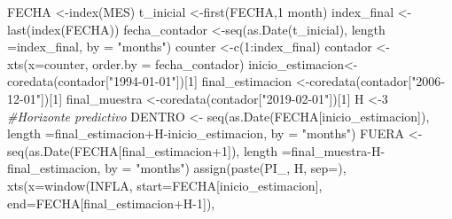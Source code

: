 \documentclass[
]{book}
\newenvironment{Shaded}{\begin{snugshade}}{\end{snugshade}}
\newcommand{\AttributeTok}[1]{\textcolor[rgb]{0.77,0.63,0.00}{#1}}
\newcommand{\CommentTok}[1]{\textcolor[rgb]{0.56,0.35,0.01}{\textit{#1}}}
\newcommand{\DecValTok}[1]{\textcolor[rgb]{0.00,0.00,0.81}{#1}}
\newcommand{\FunctionTok}[1]{\textcolor[rgb]{0.00,0.00,0.00}{#1}}
\newcommand{\NormalTok}[1]{#1}
\newcommand{\OtherTok}[1]{\textcolor[rgb]{0.56,0.35,0.01}{#1}}
\newcommand{\SpecialCharTok}[1]{\textcolor[rgb]{0.00,0.00,0.00}{#1}}
\newcommand{\StringTok}[1]{\textcolor[rgb]{0.31,0.60,0.02}{#1}}
\begin{document}
\begin{Shaded}
\begin{Highlighting}[]
\NormalTok{FECHA            }\OtherTok{\textless{}{-}}\FunctionTok{index}\NormalTok{(MES)}
\NormalTok{t\_inicial        }\OtherTok{\textless{}{-}}\FunctionTok{first}\NormalTok{(FECHA,}\StringTok{\textquotesingle{}1 month\textquotesingle{}}\NormalTok{)}
\NormalTok{index\_final      }\OtherTok{\textless{}{-}}\FunctionTok{last}\NormalTok{(}\FunctionTok{index}\NormalTok{(FECHA))}
\NormalTok{fecha\_contador   }\OtherTok{\textless{}{-}}\FunctionTok{seq}\NormalTok{(}\FunctionTok{as.Date}\NormalTok{(t\_inicial), }\AttributeTok{length =}\NormalTok{index\_final, }\AttributeTok{by =} \StringTok{"months"}\NormalTok{)}
\NormalTok{counter          }\OtherTok{\textless{}{-}}\FunctionTok{c}\NormalTok{(}\DecValTok{1}\SpecialCharTok{:}\NormalTok{index\_final)  }
\NormalTok{contador         }\OtherTok{\textless{}{-}}\FunctionTok{xts}\NormalTok{(}\AttributeTok{x=}\NormalTok{counter, }\AttributeTok{order.by =}\NormalTok{ fecha\_contador)}
\NormalTok{inicio\_estimacion}\OtherTok{\textless{}{-}}\FunctionTok{coredata}\NormalTok{(contador[}\StringTok{"1994{-}01{-}01"}\NormalTok{])[}\DecValTok{1}\NormalTok{]}
\NormalTok{final\_estimacion }\OtherTok{\textless{}{-}}\FunctionTok{coredata}\NormalTok{(contador[}\StringTok{"2006{-}12{-}01"}\NormalTok{])[}\DecValTok{1}\NormalTok{]}
\NormalTok{final\_muestra    }\OtherTok{\textless{}{-}}\FunctionTok{coredata}\NormalTok{(contador[}\StringTok{"2019{-}02{-}01"}\NormalTok{])[}\DecValTok{1}\NormalTok{]}
\NormalTok{H                }\OtherTok{\textless{}{-}}\DecValTok{3} \CommentTok{\#Horizonte predictivo}
\NormalTok{DENTRO           }\OtherTok{\textless{}{-}} \FunctionTok{seq}\NormalTok{(}\FunctionTok{as.Date}\NormalTok{(FECHA[inicio\_estimacion]), }
\AttributeTok{length =}\NormalTok{final\_estimacion}\SpecialCharTok{+}\NormalTok{H}\SpecialCharTok{{-}}\NormalTok{inicio\_estimacion, }\AttributeTok{by =} \StringTok{"months"}\NormalTok{)}
\NormalTok{FUERA            }\OtherTok{\textless{}{-}} \FunctionTok{seq}\NormalTok{(}\FunctionTok{as.Date}\NormalTok{(FECHA[final\_estimacion}\SpecialCharTok{+}\DecValTok{1}\NormalTok{]), }
\AttributeTok{length =}\NormalTok{final\_muestra}\SpecialCharTok{{-}}\NormalTok{H}\SpecialCharTok{{-}}\NormalTok{final\_estimacion, }\AttributeTok{by =} \StringTok{"months"}\NormalTok{)}
\FunctionTok{assign}\NormalTok{(}\FunctionTok{paste}\NormalTok{(}\StringTok{\textquotesingle{}PI\_\textquotesingle{}}\NormalTok{, H, }\AttributeTok{sep=}\StringTok{\textquotesingle{}\textquotesingle{}}\NormalTok{), }\FunctionTok{xts}\NormalTok{(}\AttributeTok{x=}\FunctionTok{window}\NormalTok{(INFLA, }\AttributeTok{start=}\NormalTok{FECHA[inicio\_estimacion], }\AttributeTok{end=}\NormalTok{FECHA[final\_estimacion}\SpecialCharTok{+}\NormalTok{H}\DecValTok{{-}1}\NormalTok{]),}

\end{Highlighting}
\end{Shaded}
\end{document}
